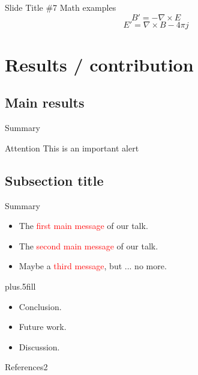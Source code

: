 \documentclass{beamer}
\begin{document}
\begin{frame}{Slide Title \#7}
	\centering
	Math examples \\[12pt]
	\begin{equation}
        	B'=-\nabla \times E
	\end{equation}
	\begin{equation*}
        	E'=\nabla \times B - 4\pi j
	\end{equation*}
\end{frame}

\section{Results / contribution}

\subsection{Main results}

\begin{frame}{Summary}
   	\begin{alertblock}{Attention}
   		\textlatin{This is an important alert}
   	\end{alertblock}
\end{frame}

%
\subsection{Subsection title}

\begin{frame}{Summary}
	\begin{itemize}
		\item The \textcolor{red}{first main message} of our talk.
		\item The \textcolor{red}{second main message} of our talk.
		\item Maybe a \textcolor{red}{third message}, but ... no more.
	\end{itemize}
	\vskip0pt plus.5fill
	\begin{itemize}
		\item Conclusion.
	\end{itemize}
	\begin{itemize}
		\item Future work.
		\item Discussion.
	\end{itemize}
\end{frame}


\begin{frame}{References2}

\end{frame}

\end{document}
